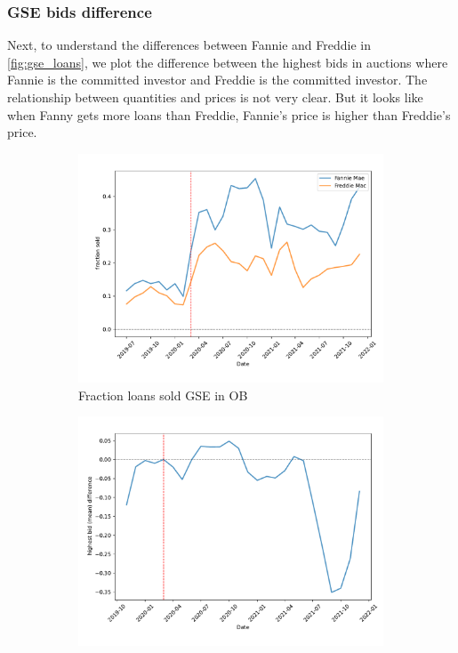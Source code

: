 \documentclass[11pt,a4paper]{article}
\begin{document}
\pagebreak
\subsubsection{GSE bids difference}

Next, to understand the differences between Fannie and Freddie in \ref{fig:gse_loans}, we plot the difference between the highest bids in auctions where Fannie is the committed investor and Freddie is the committed investor. The relationship between quantities and prices is not very clear. But it looks like when Fanny gets more loans than Freddie, Fannie's price is higher than Freddie's price.

\begin{figure}[h]
  \centering
  \begin{subfigure}[b]{0.49\textwidth}
      \includegraphics[width=0.998\textwidth]{../results/figures/sold_FreddieBid_mean_mat30_loan1_timeseries_nrmonthly_2.5_4_c25.0.pdf}
      \caption{Fraction loans sold GSE in OB } %
     \end{subfigure}
     \begin{subfigure}[b]{0.49\textwidth}
      \includegraphics[width=0.998\textwidth]{../results/figures/price_diff_ma_mat30_loan1_timeseries_nrmonthly_2.5_4_diffFF_ma5_c25.pdf}

\end{subfigure}
\end{figure}
\end{document}
